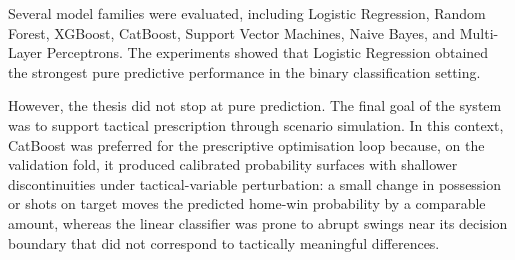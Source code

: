 Several model families were evaluated, including Logistic Regression, Random Forest, XGBoost, CatBoost, Support Vector Machines, Naive Bayes, and Multi-Layer Perceptrons. The experiments showed that Logistic Regression obtained the strongest pure predictive performance in the binary classification setting.

However, the thesis did not stop at pure prediction. The final goal of the system was to support tactical prescription through scenario simulation. In this context, CatBoost was preferred for the prescriptive optimisation loop because, on the validation fold, it produced calibrated probability surfaces with shallower discontinuities under tactical-variable perturbation: a small change in possession or shots on target moves the predicted home-win probability by a comparable amount, whereas the linear classifier was prone to abrupt swings near its decision boundary that did not correspond to tactically meaningful differences.

